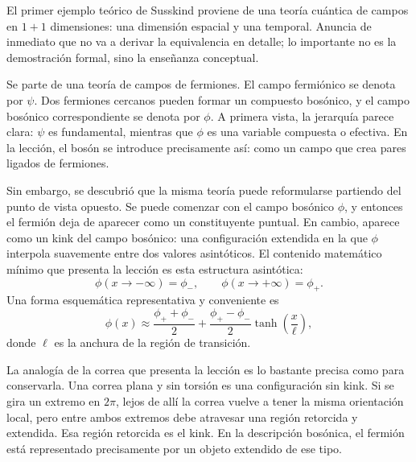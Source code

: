 El primer ejemplo teórico de Susskind proviene de una teoría cuántica de campos en \(1+1\) dimensiones: una dimensión espacial y una temporal. Anuncia de inmediato que no va a derivar la equivalencia en detalle; lo importante no es la demostración formal, sino la enseñanza conceptual.

Se parte de una teoría de campos de fermiones. El campo fermiónico se denota por \(\psi\). Dos fermiones cercanos pueden formar un compuesto bosónico, y el campo bosónico correspondiente se denota por \(\phi\). A primera vista, la jerarquía parece clara: \(\psi\) es fundamental, mientras que \(\phi\) es una variable compuesta o efectiva. En la lección, el bosón se introduce precisamente así: como un campo que crea pares ligados de fermiones.

Sin embargo, se descubrió que la misma teoría puede reformularse partiendo del punto de vista opuesto. Se puede comenzar con el campo bosónico \(\phi\), y entonces el fermión deja de aparecer como un constituyente puntual. En cambio, aparece como un kink del campo bosónico: una configuración extendida en la que \(\phi\) interpola suavemente entre dos valores asintóticos. El contenido matemático mínimo que presenta la lección es esta estructura asintótica:
\begin{equation}
\phi(x\to -\infty)=\phi_-,
\qquad
\phi(x\to +\infty)=\phi_+.
\end{equation}
Una forma esquemática representativa y conveniente es
\begin{equation}
\phi(x)\approx \frac{\phi_++\phi_-}{2}
+
\frac{\phi_+-\phi_-}{2}\tanh\!\left(\frac{x}{\ell}\right),
\end{equation}
donde \(\ell\) es la anchura de la región de transición.


La analogía de la correa que presenta la lección es lo bastante precisa como para conservarla. Una correa plana y sin torsión es una configuración sin kink. Si se gira un extremo en \(2\pi\), lejos de allí la correa vuelve a tener la misma orientación local, pero entre ambos extremos debe atravesar una región retorcida y extendida. Esa región retorcida es el kink. En la descripción bosónica, el fermión está representado precisamente por un objeto extendido de ese tipo.

